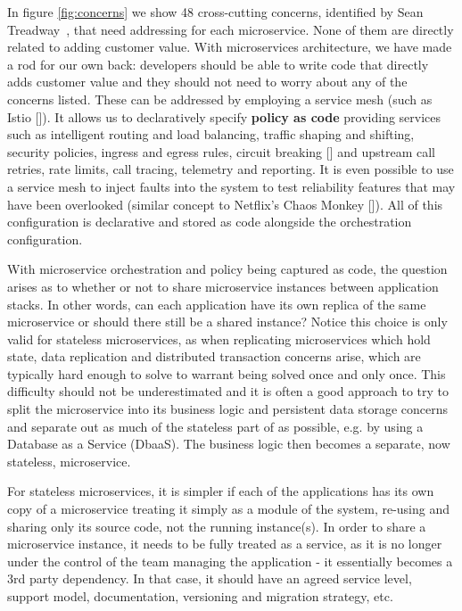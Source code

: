 \documentclass[reprint,amsmath,amssymb,aps]{revtex4-1}
\begin{document}
In figure \ref{fig:concerns} we show 48 cross-cutting concerns, identified by Sean Treadway~\cite{Treadway17:online}, that need addressing for each microservice. None of them are directly related to adding customer value. With microservices architecture, we have made a rod for our own back: developers should be able to write code that directly adds customer value and they should not need to worry about any of the concerns listed. These can be addressed by employing a service mesh (such as Istio []). It allows us to declaratively specify \textbf{policy as code} providing services such as intelligent routing and load balancing, traffic shaping and shifting, security policies, ingress and egress rules, circuit breaking [] and upstream call retries, rate limits, call tracing, telemetry and reporting. It is even possible to use a service mesh to inject faults into the system to test reliability features that may have been overlooked (similar concept to Netflix's Chaos Monkey []). All of this configuration is declarative and stored as code alongside the orchestration configuration.

With microservice orchestration and policy being captured as code, the question arises as to whether or not to share microservice instances between application stacks. In other words, can each application have its own replica of the same microservice or should there still be a shared instance? Notice this choice is only valid for stateless microservices, as when replicating microservices which hold state, data replication and distributed transaction concerns arise, which are typically hard enough to solve to warrant being solved once and only once. This difficulty should not be underestimated and it is often a good approach to try to split the microservice into its business logic and persistent data storage concerns and separate out as much of the stateless part of as possible, e.g. by using a Database as a Service (DbaaS). The business logic then becomes a separate, now stateless, microservice.

For stateless microservices, it is simpler if each of the applications has its own copy of a microservice treating it simply as a module of the system, re-using and sharing only its source code, not the running instance(s). In order to share a microservice instance, it needs to be fully treated as a service, as it is no longer under the control of the team managing the application - it essentially becomes a 3rd party dependency. In that case, it should have an agreed service level, support model, documentation, versioning and migration strategy, etc.
\end{document}
